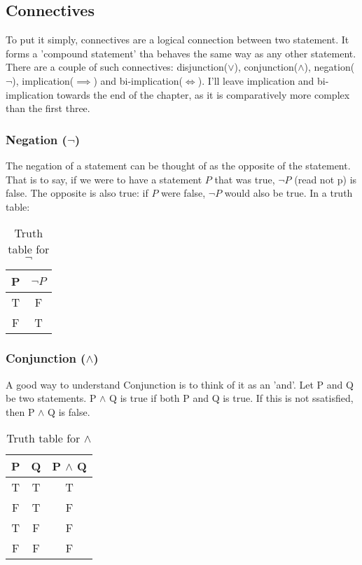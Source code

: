 \documentclass[a4paper]{article}
\begin{document}
\subsection{Connectives}
To put it simply, connectives are a logical connection between two statement. It forms a 'compound statement' tha behaves the same way as any other statement. There are a couple of such connectives: disjunction($\vee$), conjunction($\wedge$), negation($\neg$), implication($\implies$) and bi-implication($\iff$). I'll leave implication and bi-implication towards the end of the chapter, as it is comparatively more complex than the first three.
\subsubsection{Negation ($\neg$)}
The negation of a statement can be thought of as the opposite of the statement. That is to say, if we were to have a statement $P$ that was true, $\neg P$ (read not p) is false. The opposite is also true: if $P$ were false, $\neg P$ would also be true.
In a truth table:
\begin{table}[htpb]
	\centering
	\caption{Truth table for $\neg$}
	\label{tab:label}

	\vspace{5pt}	
	\begin{tabular}{c|c}
		P & $\neg P$ \\ \hline 
		T & F \\
		F & T \\
	\end{tabular}
\end{table}
\subsubsection{Conjunction ($\wedge$)}
A good way to understand Conjunction is to think of it as an 'and'. Let P and Q be two statements. P $\wedge$ Q is true if both P and Q is true. If this is not ssatisfied, then P  $\wedge$ Q is false.

\begin{table}[htpb]
	\centering
	\caption{Truth table for $\wedge$}
	\label{tab:conjunction table}
	\vspace{5pt}
	\begin{tabular}{c|c|c}
		P & Q & P $\wedge$ Q\\ \hline
		T & T & T \\
		F & T & F \\
		T & F & F \\
		F & F & F \\
	\end{tabular}
\end{table}
\end{document}
